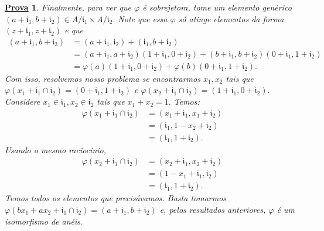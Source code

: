\documentclass{article}
\newtheorem*{proof*}{\underline{Prova}}
\begin{document}
\begin{proof*}
      Finalmente, para ver que \(\varphi \) é sobrejetora, tome um elemento genérico \((a+\mathfrak{i}_{1}, b+\mathfrak{i}_{2})\in A/\mathfrak{i}_{1}\times A/\mathfrak{i}_{2}.\)
      Note que essa \(\varphi \) só atinge elementos da forma \((z + \mathfrak{i}_{1}, z + \mathfrak{i}_{2})\) e que 
      \begin{align*}
        (a+\mathfrak{i}_{1}, b+\mathfrak{i}_{2}) &= (a+\mathfrak{i}_{1}, \mathfrak{i}_{2}) + (\mathfrak{i}_{1}, b + \mathfrak{i}_{2})\\
                                                 &= (a+\mathfrak{i}_{1}, a + \mathfrak{i}_{2})(1+\mathfrak{i}_{1}, 0 + \mathfrak{i}_{2}) + (b+\mathfrak{i}_{1}, b+\mathfrak{i}_{2})(0+\mathfrak{i}_{1}, 1 + \mathfrak{i}_{2})\\
                                                 &= \varphi(a)(1+\mathfrak{i}_{1}, 0 + \mathfrak{i}_{2}) + \varphi(b)(0+\mathfrak{i}_{1}, 1 + \mathfrak{i}_{2}).
      \end{align*}
      Com isso, resolvemos nosso problema se encontrarmos \(x_{1}, x_{2}\) tais que \(\varphi (x_{1}+\mathfrak{i}_{1}\cap \mathfrak{i}_{2}) = (0 +\mathfrak{i}_{1}, 1 +\mathfrak{i}_{2})\) e 
      \(\varphi (x_{2} + \mathfrak{i}_{1}\cap \mathfrak{i}_{2}) = (1+\mathfrak{i}_{1}, 0+\mathfrak{i}_{2}).\) Considere
      \(x_{1}\in \mathfrak{i}_{1}, x_{2}\in \mathfrak{i}_{2}\) tais que \(x_{1} + x_{2} = 1.\) Temos:
      \begin{align*}
        \varphi (x_{1}+\mathfrak{i}_{1}\cap \mathfrak{i}_{2}) &= (x_{1}+\mathfrak{i}_{1}, x_{1}+\mathfrak{i}_{2})\\
                                                              &= (\mathfrak{i}_{1}, 1 - x_{2} + \mathfrak{i}_{2})\\
                                                              &= (\mathfrak{i}_{1}, 1+\mathfrak{i}_{2}).
      \end{align*}
      Usando o mesmo raciocínio, 
      \begin{align*}
        \varphi (x_{2} + \mathfrak{i}_{1}\cap \mathfrak{i}_{2}) &= (x_{2}+\mathfrak{i}_{1}, x_{2}+\mathfrak{i}_{2})\\
                                                                &= (1-x_{1}+\mathfrak{i}_{1}, \mathfrak{i}_{2})\\
                                                                &= (\mathfrak{i}_{1}, 1 + \mathfrak{i}_{2}).
      \end{align*}
      Temos todos os elementos que precisávamos. Basta tomarmos \(\varphi (bx_{1} + ax_{2} + \mathfrak{i}_{1}\cap \mathfrak{i}_{2}) = (a+\mathfrak{i}_{1}, b+\mathfrak{i}_{2})\) e, pelos resultados anteriores,
      \(\varphi \) é um isomorfismo de anéis.


\end{proof*}
\end{document}
